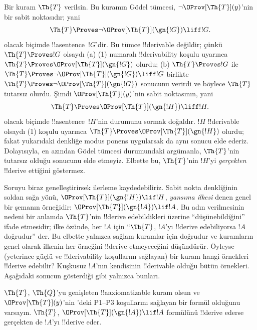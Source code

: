 \documentclass[../../../include/open-logic-section]{subfiles}
\begin{document}


Bir kuram $\Th{T}$ verilsin. Bu kuramın G\"odel tümcesi,
$\lnot \OProv[\Th{T}](y)$'nin bir sabit noktasıdır; yani
\[
\Th{T} \Proves \lnot \OProv[\Th{T}](\gn{!G}) \liff !G.
\]
olacak biçimde !!a{sentence}~$!G$'dir. Bu tümce !!{derivable} değildir;
çünkü $\Th{T} \Proves !G$ olsaydı (a) (1) numaralı !!{derivability} koşulu
uyarınca $\Th{T} \Proves \OProv[\Th{T}](\gn{!G})$ olurdu; (b)
$\Th{T} \Proves !G$ ile
$\Th{T} \Proves \lnot \OProv[\Th{T}](\gn{!G}) \liff !G$ birlikte
$\Th{T} \Proves \lnot \OProv[\Th{T}](\gn{!G})$ sonucunu verirdi ve böylece
$\Th{T}$ tutarsız olurdu. Şimdi $\OProv[\Th{T}](y)$'nin sabit noktasının,
yani
\[
\Th{T} \Proves \OProv[\Th{T}](\gn{!H}) \liff !H.
\]
olacak biçimde !!a{sentence}~$!H$'nin durumunu sormak doğaldır. $!H$
!!{derivable} olsaydı (1) koşulu uyarınca
$\Th{T} \Proves \OProv[\Th{T}](\gn{!H})$ olurdu; fakat yukarıdaki denkliğe
modus ponens uygularsak da aynı sonucu elde ederiz. Dolayısıyla, en azından
G\"odel tümcesi durumundaki argümanla, $\Th{T}$'nin tutarsız olduğu sonucunu
elde etmeyiz. Elbette bu, $\Th{T}$'nin $!H$'yi \emph{gerçekten}
!!{derive} ettiğini göstermez.

Soruyu biraz genelleştirirsek ilerleme kaydedebiliriz. Sabit nokta denkliğinin
soldan sağa yönü, $\OProv[\Th{T}](\gn{!H}) \lif !H$, \emph{yansıma ilkesi}
denen genel bir şemanın örneğidir:
$\OProv[\Th{T}](\gn{!A}) \lif !A$. Bu adın verilmesinin nedeni bir anlamda
$\Th{T}$'nin !!{derive} edebildikleri üzerine ``düşünebildiğini'' ifade
etmesidir; ilke özünde, her $!A$ için ``$\Th{T}$, $!A$'yı !!{derive}
edebiliyorsa $!A$ doğrudur'' der. Bu elbette yalnızca sağlam kuramlar için
doğrudur ve kuramların genel olarak ilkenin her örneğini !!{derive}
etmeyeceğini düşündürür. Öyleyse (yeterince güçlü ve !!{derivability}
koşullarını sağlayan) bir kuram hangi örnekleri !!{derive} edebilir? Kuşkusuz
$!A$'nın kendisinin !!{derivable} olduğu bütün örnekleri. Aşağıdaki sonucun
gösterdiği gibi yalnızca bunları.

\begin{thm}
$\Th{T}$, $\Th{Q}$'yu genişleten !!a{axiomatizable} kuram olsun ve
$\OProv[\Th{T}](y)$'nin
'deki P1--P3 koşullarını sağlayan bir formül olduğunu
varsayın. $\Th{T}$, $\OProv[\Th{T}](\gn{!A}) \lif !A$ formülünü !!{derive}
ederse gerçekten de $!A$'yı !!{derive} eder.
\end{thm}
\end{document}
